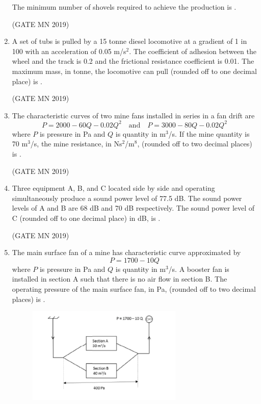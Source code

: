 \documentclass[journal]{IEEEtran}
\begin{document}
\begin{enumerate}
The minimum number of shovels required to achieve the production is \underline{\hspace{2cm}}. 

\hfill(GATE MN 2019)


\item A set of tubs is pulled by a 15 tonne diesel locomotive at a gradient of 1 in 100 with an acceleration of 0.05 m/s$^{2}$. The coefficient of adhesion between the wheel and the track is 0.2 and the frictional resistance coefficient is 0.01. The maximum mass, in tonne, the locomotive can pull (rounded off to one decimal place) is \underline{\hspace{2cm}}.  


	\hfill(GATE MN 2019)
\item The characteristic curves of two mine fans installed in series in a fan drift are  
\[
P = 2000 - 60Q - 0.02Q^{2} \quad \text{and} \quad P = 3000 - 80Q - 0.02Q^{2}
\]  
where $P$ is pressure in Pa and $Q$ is quantity in m$^{3}$/s. If the mine quantity is 70 m$^{3}$/s, the mine resistance, in Ns$^{2}$/m$^{8}$, (rounded off to two decimal places) is \underline{\hspace{2cm}}.  

\hfill(GATE MN 2019)


\item Three equipment A, B, and C located side by side and operating simultaneously produce a sound power level of 77.5 dB. The sound power levels of A and B are 68 dB and 70 dB respectively. The sound power level of C (rounded off to one decimal place) in dB, is \underline{\hspace{2cm}}.  


	\hfill(GATE MN 2019)

\item The main surface fan of a mine has characteristic curve approximated by  
\[
P = 1700 - 10Q
\]  
where $P$ is pressure in Pa and $Q$ is quantity in m$^{3}$/s. A booster fan is installed in section A such that there is no air flow in section B. The operating pressure of the main surface fan, in Pa, (rounded off to two decimal places) is \underline{\hspace{2cm}}.

\begin{figure}[H]
    \centering
        \includegraphics[width=0.7\textwidth]{Screenshot_2025_0818_152006.png}
	    \caption{}
    \label{fig:Q53}
    \end{figure}



\end{enumerate}
\end{document}

